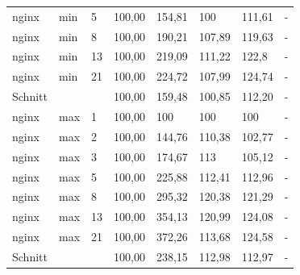 \begin{footnotesize}
\begin{longtable}{llllllll}
		nginx          & min     & 5          & 100,00 & 154,81                      & 100                         & 111,61                      & -                           \\
		nginx          & min     & 8          & 100,00 & 190,21                      & 107,89                      & 119,63                      & -                           \\
		nginx          & min     & 13         & 100,00 & 219,09                      & 111,22                      & 122,8                       & -                           \\
		nginx          & min     & 21         & 100,00 & 224,72                      & 107,99                      & 124,74                      & -                           \\ \hline
		Schnitt        &         &            & 100,00 & 159,48                      & 100,85                      & 112,20                      & -                           \\ \hline
		nginx          & max     & 1          & 100,00 & \cellcolor[HTML]{C0C0C0}100 & \cellcolor[HTML]{C0C0C0}100 & \cellcolor[HTML]{C0C0C0}100 & -                           \\
		nginx          & max     & 2          & 100,00 & 144,76                      & 110,38                      & 102,77                      & -                           \\
		nginx          & max     & 3          & 100,00 & 174,67                      & 113                         & 105,12                      & -                           \\
		nginx          & max     & 5          & 100,00 & 225,88                      & 112,41                      & 112,96                      & -                           \\
		nginx          & max     & 8          & 100,00 & 295,32                      & 120,38                      & 121,29                      & -                           \\
		nginx          & max     & 13         & 100,00 & 354,13                      & 120,99                      & 124,08                      & -                           \\
		nginx          & max     & 21         & 100,00 & 372,26                      & 113,68                      & 124,58                      & -                           \\ \hline
		Schnitt        &         &            & 100,00 & 238,15                      & 112,98                      & 112,97                      & -                           \\ \hline

\end{longtable}
\end{footnotesize}
